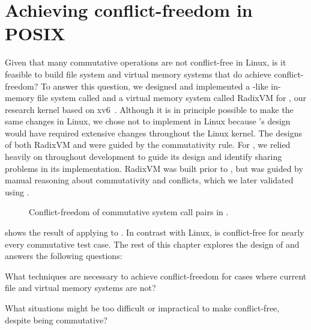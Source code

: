 \section{Achieving conflict-freedom in POSIX}


Given that many commutative operations are not conflict-free in Linux,
is it feasible to build file system and virtual memory systems that
do achieve conflict-freedom?
%
To answer this
question, we designed and implemented a -like in-memory
file system called \fs and a virtual memory system called RadixVM for
\sys, our research kernel based on xv6~\cite{xv6}.
%
Although it is in principle possible to make the same changes in Linux,
we chose not to implement \fs in Linux because \fs's design
would have required extensive changes throughout the Linux kernel.
%
The designs of both RadixVM and \fs were guided by the
commutativity rule.  For \fs, we relied heavily on \tool throughout
development to guide its design and identify sharing problems in its
implementation.  RadixVM
was built prior to
\tool, but was guided by manual reasoning about commutativity and
conflicts, which we later validated using \tool.

\begin{figure*}
\small
\centering
{}
\caption{Conflict-freedom of commutative system call pairs in \sys.}
\label{fig:testcase-breakdown-sv6}
\end{figure*}

 shows the result of applying \tool
to \sys.  In contrast with Linux, \sys is conflict-free for nearly
every commutative test case.  The rest of this chapter explores the
design of \sys and answers the following questions:

\begin{CompactItemize}

\item What techniques are necessary to achieve conflict-freedom for
      cases where current file and virtual memory systems are not?

\item What situations might be too difficult or impractical to
      make conflict-free, despite being commutative?

\end{CompactItemize}

